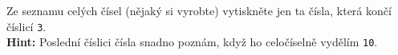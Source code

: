 \question[30]
Ze seznamu celých čísel (nějaký si vyrobte) vytiskněte jen ta čísla, která končí
číslicí \texttt{3}.\\
\textbf{Hint:} Poslední číslici čísla snadno poznám, když ho celočíselně vydělím
\texttt{10}.